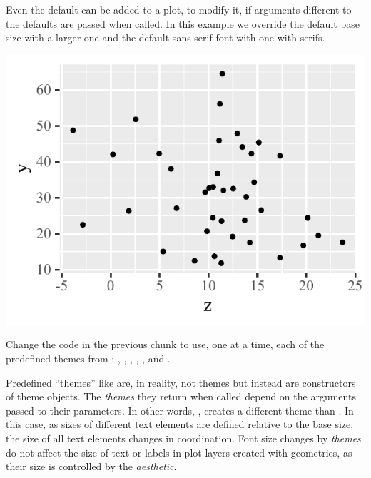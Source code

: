\documentclass[krantz2]{krantz}\usepackage{knitr}
\begin{document}
Even the default  can be added to a plot, to modify it, if arguments different to the defaults are passed when called. In this example we override the default base size with a larger one and the default sans-serif font with one with serifs.

\begin{knitrout}\footnotesize
{}\color{fgcolor}\begin{kframe}
\begin{alltt}
  \hlopt{+}
  \hlstd{()} \hlopt{+}
  \hlstd{(} \hlstd{=} \hlstd{,}
              \hlstd{=} \hlstd{)}
\end{alltt}
\end{kframe}

{\centering \includegraphics[width=.54\textwidth]{figure/pos-themes-01-1} 

}



\end{knitrout}

\begin{playground}
Change the code in the previous chunk to use, one at a time, each of the predefined themes from \ggplot: , , , , ,  and .
\end{playground}

\begin{explainbox}
Predefined ``themes'' like  are, in reality, not themes but instead are constructors of theme objects. The \emph{themes} they return when called depend on the arguments passed to their parameters. In other words, , creates a different theme than . In this case, as sizes of different text elements are defined relative to the base size, the size of all text elements changes in coordination. Font size changes by \emph{themes} do not affect the size of text or labels in plot layers created with geometries, as their size is controlled by the  \emph{aesthetic}.
\end{explainbox}
\end{document}
